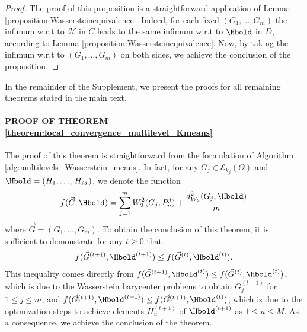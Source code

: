 \begin{proof} The proof of this proposition is a straightforward application of Lemma \ref{proposition:Wassersteinequivalence}. Indeed, for each fixed $(G_{1},\ldots,G_{m})$ the infimum w.r.t to $\mathcal{H}$ in $C$ leads to the same infimum w.r.t to $\Hbold$ in $D$, according to Lemma \ref{proposition:Wassersteinequivalence}. Now, by taking the infimum w.r.t to $(G_{1},\ldots,G_{m})$ on both sides, we achieve the conclusion of the proposition.
\end{proof}

In the remainder of the Supplement, we present the proofs for all remaining
theorems stated in the main text.
\paragraph{PROOF OF THEOREM \ref{theorem:local_convergence_multilevel_Kmeans}} %
The proof of this theorem is straightforward from the formulation of Algorithm \ref{alg:multilevels_Wasserstein_means}. %
In fact, for any $G_{j} \in \mathcal{E}_{k_{j}}(\Theta)$ and $\Hbold =(H_{1},\ldots,H_{M})$, we denote the function 
\begin{eqnarray}
f(\vec{G}, \Hbold)=\mathop {\sum }\limits_{j=1}^{m}{W_{2}^{2}(G_{j},P_{n}^{j})}+\dfrac{d_{W_{2}}^{2}(G_{j},\Hbold)}{m} \nonumber
\end{eqnarray}
where $\vec{G}=(G_{1},\ldots,G_{m})$. To obtain the conclusion of this theorem, it is sufficient to demonstrate for any $t \geq 0$ that
\begin{eqnarray}
f(\vec{G}^{(t+1)},\Hbold^{(t+1)}) \leq f(\vec{G}^{(t)},\Hbold^{(t)}). \nonumber
\end{eqnarray}
This inequality comes directly from $f(\vec{G}^{(t+1)},\Hbold^{(t)}) \leq f(\vec{G}^{(t)},\Hbold^{(t)})$, which is due to the Wasserstein barycenter problems to obtain $G_{j}^{(t+1)}$ for $1 \leq j \leq m$, and $f(\vec{G}^{(t+1)},\Hbold^{(t+1)}) \leq f(\vec{G}^{(t+1)},\Hbold^{(t)})$, which is due to the optimization steps to achieve elements $H_{u}^{(t+1)}$ of $\Hbold^{(t+1)}$ as $1 \leq u \leq M$. As a consequence, we achieve the conclusion of the theorem.
